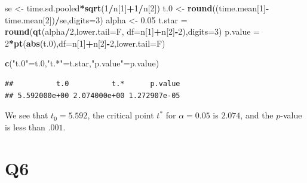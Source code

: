 \documentclass[
  11pt,
]{article}
\newenvironment{Shaded}{\begin{snugshade}}{\end{snugshade}}
\newcommand{\AttributeTok}[1]{\textcolor[rgb]{0.13,0.29,0.53}{#1}}
\newcommand{\DecValTok}[1]{\textcolor[rgb]{0.00,0.00,0.81}{#1}}
\newcommand{\FloatTok}[1]{\textcolor[rgb]{0.00,0.00,0.81}{#1}}
\newcommand{\FunctionTok}[1]{\textcolor[rgb]{0.13,0.29,0.53}{\textbf{#1}}}
\newcommand{\NormalTok}[1]{#1}
\newcommand{\OtherTok}[1]{\textcolor[rgb]{0.56,0.35,0.01}{#1}}
\newcommand{\SpecialCharTok}[1]{\textcolor[rgb]{0.81,0.36,0.00}{\textbf{#1}}}
\newcommand{\StringTok}[1]{\textcolor[rgb]{0.31,0.60,0.02}{#1}}
\begin{document}
\begin{Shaded}
\begin{Highlighting}[]
\NormalTok{se }\OtherTok{\textless{}{-}}\NormalTok{ time.sd.pooled}\SpecialCharTok{*}\FunctionTok{sqrt}\NormalTok{(}\DecValTok{1}\SpecialCharTok{/}\NormalTok{n[}\DecValTok{1}\NormalTok{]}\SpecialCharTok{+}\DecValTok{1}\SpecialCharTok{/}\NormalTok{n[}\DecValTok{2}\NormalTok{])}
\NormalTok{t}\FloatTok{.0} \OtherTok{\textless{}{-}} \FunctionTok{round}\NormalTok{((time.mean[}\DecValTok{1}\NormalTok{]}\SpecialCharTok{{-}}\NormalTok{time.mean[}\DecValTok{2}\NormalTok{])}\SpecialCharTok{/}\NormalTok{se,}\AttributeTok{digits=}\DecValTok{3}\NormalTok{)}
\NormalTok{alpha }\OtherTok{\textless{}{-}} \FloatTok{0.05}
\NormalTok{t.star }\OtherTok{=} \FunctionTok{round}\NormalTok{(}\FunctionTok{qt}\NormalTok{(alpha}\SpecialCharTok{/}\DecValTok{2}\NormalTok{,}\AttributeTok{lower.tail=}\NormalTok{F, }\AttributeTok{df=}\NormalTok{n[}\DecValTok{1}\NormalTok{]}\SpecialCharTok{+}\NormalTok{n[}\DecValTok{2}\NormalTok{]}\SpecialCharTok{{-}}\DecValTok{2}\NormalTok{),}\AttributeTok{digits=}\DecValTok{3}\NormalTok{)}
\NormalTok{p.value }\OtherTok{=} \DecValTok{2}\SpecialCharTok{*}\FunctionTok{pt}\NormalTok{(}\FunctionTok{abs}\NormalTok{(t}\FloatTok{.0}\NormalTok{),}\AttributeTok{df=}\NormalTok{n[}\DecValTok{1}\NormalTok{]}\SpecialCharTok{+}\NormalTok{n[}\DecValTok{2}\NormalTok{]}\SpecialCharTok{{-}}\DecValTok{2}\NormalTok{,}\AttributeTok{lower.tail=}\NormalTok{F)}

\FunctionTok{c}\NormalTok{(}\StringTok{"t.0"}\OtherTok{=}\NormalTok{t}\FloatTok{.0}\NormalTok{,}\StringTok{"t.*"}\OtherTok{=}\NormalTok{t.star,}\StringTok{"p.value"}\OtherTok{=}\NormalTok{p.value)}
\end{Highlighting}
\end{Shaded}

\begin{verbatim}
##          t.0          t.*      p.value 
## 5.592000e+00 2.074000e+00 1.272907e-05
\end{verbatim}

We see that \(t_0 = 5.592\), the critical point \(t^*\) for
\(\alpha = 0.05\) is \(2.074\), and the \(p\)-value is less than
\(.001\).

\hypertarget{q6}{%
\section{Q6}\label{q6}}

\end{document}
